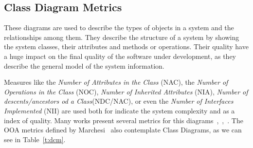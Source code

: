 \subsection{Class Diagram Metrics}

These diagrams are used to describe the types of objects in a system and the relationships among them.
They describe the structure of a system by showing the system classes, their attributes and methods or operations.
Their quality have a huge impact on the final quality of the software under development, as they describe the general model of the system information.

Measures like the \emph{Number of Attributes in the Class} (NAC), the \emph{Number of Operations in the Class} (NOC), \emph{Number of Inherited Attributes } (NIA), \emph{Number of descents/ancestors od a Class}(NDC/NAC), or even the \emph{Number of Interfaces Implemented} (NII) are used both for indicate the system complexity and as a index of quality.
Many works present several metrics for this diagrams~\cite{DBLP:journals/Lobjet/GeneroPC00},~\cite{Eichelberger_onclass},~\cite{Yi04acomparison}.
The OOA metrics defined by Marchesi~\cite{Marchesi:1998:OMU:522081.795010} also contemplate Class Diagrams, as we can see in Table~\ref{t:dcm}.

